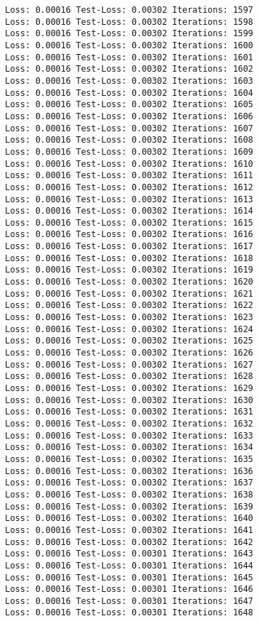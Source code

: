 \documentclass[11pt]{article}
\begin{document}
\begin{Verbatim}[commandchars=\\\{\}]
Loss: 0.00016 Test-Loss: 0.00302 Iterations: 1597
Loss: 0.00016 Test-Loss: 0.00302 Iterations: 1598
Loss: 0.00016 Test-Loss: 0.00302 Iterations: 1599
Loss: 0.00016 Test-Loss: 0.00302 Iterations: 1600
Loss: 0.00016 Test-Loss: 0.00302 Iterations: 1601
Loss: 0.00016 Test-Loss: 0.00302 Iterations: 1602
Loss: 0.00016 Test-Loss: 0.00302 Iterations: 1603
Loss: 0.00016 Test-Loss: 0.00302 Iterations: 1604
Loss: 0.00016 Test-Loss: 0.00302 Iterations: 1605
Loss: 0.00016 Test-Loss: 0.00302 Iterations: 1606
Loss: 0.00016 Test-Loss: 0.00302 Iterations: 1607
Loss: 0.00016 Test-Loss: 0.00302 Iterations: 1608
Loss: 0.00016 Test-Loss: 0.00302 Iterations: 1609
Loss: 0.00016 Test-Loss: 0.00302 Iterations: 1610
Loss: 0.00016 Test-Loss: 0.00302 Iterations: 1611
Loss: 0.00016 Test-Loss: 0.00302 Iterations: 1612
Loss: 0.00016 Test-Loss: 0.00302 Iterations: 1613
Loss: 0.00016 Test-Loss: 0.00302 Iterations: 1614
Loss: 0.00016 Test-Loss: 0.00302 Iterations: 1615
Loss: 0.00016 Test-Loss: 0.00302 Iterations: 1616
Loss: 0.00016 Test-Loss: 0.00302 Iterations: 1617
Loss: 0.00016 Test-Loss: 0.00302 Iterations: 1618
Loss: 0.00016 Test-Loss: 0.00302 Iterations: 1619
Loss: 0.00016 Test-Loss: 0.00302 Iterations: 1620
Loss: 0.00016 Test-Loss: 0.00302 Iterations: 1621
Loss: 0.00016 Test-Loss: 0.00302 Iterations: 1622
Loss: 0.00016 Test-Loss: 0.00302 Iterations: 1623
Loss: 0.00016 Test-Loss: 0.00302 Iterations: 1624
Loss: 0.00016 Test-Loss: 0.00302 Iterations: 1625
Loss: 0.00016 Test-Loss: 0.00302 Iterations: 1626
Loss: 0.00016 Test-Loss: 0.00302 Iterations: 1627
Loss: 0.00016 Test-Loss: 0.00302 Iterations: 1628
Loss: 0.00016 Test-Loss: 0.00302 Iterations: 1629
Loss: 0.00016 Test-Loss: 0.00302 Iterations: 1630
Loss: 0.00016 Test-Loss: 0.00302 Iterations: 1631
Loss: 0.00016 Test-Loss: 0.00302 Iterations: 1632
Loss: 0.00016 Test-Loss: 0.00302 Iterations: 1633
Loss: 0.00016 Test-Loss: 0.00302 Iterations: 1634
Loss: 0.00016 Test-Loss: 0.00302 Iterations: 1635
Loss: 0.00016 Test-Loss: 0.00302 Iterations: 1636
Loss: 0.00016 Test-Loss: 0.00302 Iterations: 1637
Loss: 0.00016 Test-Loss: 0.00302 Iterations: 1638
Loss: 0.00016 Test-Loss: 0.00302 Iterations: 1639
Loss: 0.00016 Test-Loss: 0.00302 Iterations: 1640
Loss: 0.00016 Test-Loss: 0.00302 Iterations: 1641
Loss: 0.00016 Test-Loss: 0.00302 Iterations: 1642
Loss: 0.00016 Test-Loss: 0.00301 Iterations: 1643
Loss: 0.00016 Test-Loss: 0.00301 Iterations: 1644
Loss: 0.00016 Test-Loss: 0.00301 Iterations: 1645
Loss: 0.00016 Test-Loss: 0.00301 Iterations: 1646
Loss: 0.00016 Test-Loss: 0.00301 Iterations: 1647
Loss: 0.00016 Test-Loss: 0.00301 Iterations: 1648

\end{Verbatim}
\end{document}
